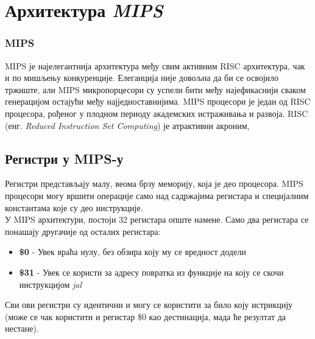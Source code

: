 \documentclass[12pt,oneside]{memoir}
\begin{document}



\chapter{Архитектура \textit{MIPS}}
\label{chp:mips}
\subsection{MIPS}
MIPS је најелегантнија архитектура међу свим активним RISC архитектура, чак и по мишљењу конкуренције. Елеганција није довољна да би се освојило тржиште, али MIPS микропорцесори су успели бити међу најефикаснији сваком генерацијом остајући међу најједноставнијима.
MIPS процесори је један од RISC процесора, рођеног у плодном периоду академских истраживања и развоја. RISC  (енг. \textit{Reduced Instruction Set Computing}) је атрактивни акроним, 
~\cite{SeeMIPSRun}

\section{Регистри у MIPS-у}

\indent Регистри представљају малу, веома брзу меморију, која је део процесора. MIPS процесори могу вршити операције само над садржајима регистара и специјалним константама које су део инструкције. \\
\indent У MIPS архитектури, постоји 32 регистара опште намене. Само два регистара се понашају другачије од осталих регистара:
\begin{itemize}
  \item \textbf{\$0} - Увек враћа нулу, без обзира коју му се вредност додели
  \item \textbf{\$31} - Увек се користи за адресу повратка из функције на коју се скочи инструкцијом \textit{jal}
\end{itemize}
Сви ови регистри су идентични и могу се користити за било коју истрикцију (може се чак користити и регистар \$0 као дестинација, мада ће резултат да нестане). 
\end{document}
